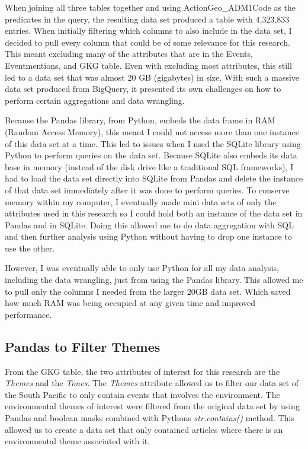 \documentclass[12pt]{article}
\begin{document}
When joining all three tables together and using ActionGeo\_ADM1Code as the predicates in the query, the resulting data set produced a table with 4,323,833 entries. When initially filtering which columns to also include in the data set, I decided to pull every column that could be of some relevance for this research. This meant excluding many of the attributes that are in the Events, Eventmentions, and GKG table. Even with excluding most attributes, this still led to a data set that was almost 20 GB (gigabytes) in size. With such a massive data set produced from BigQuery, it presented its own challenges on how to perform certain aggregations and data wrangling. 
    
Because the Pandas library, from Python, embeds the data frame in RAM (Random Access Memory), this meant I could not access more than one instance of this data set at a time. This led to issues when I used the SQLite library using Python to perform queries on the data set. Because SQLite also embeds its data base in memory (instead of the disk drive like a traditional SQL frameworks), I had to load the data set directly into SQLite from Pandas and delete the instance of that data set immediately after it was done to perform queries. To conserve memory within my computer, I eventually made mini data sets of only the attributes used in this research so I could hold both an instance of the data set in Pandas and in SQLite. Doing this allowed me to do data aggregation with SQL and then further analysis using Python without having to drop one instance to use the other. 

However, I was eventually able to only use Python for all my data analysis, including the data wrangling, just from using the Pandas library. This allowed me to pull only the columns I needed from the larger 20GB data set. Which saved how much RAM was being occupied at any given time and improved performance.  

\subsection*{Pandas to Filter Themes}

From the GKG table, the two attributes of interest for this research are the \textit{Themes} and the \textit{Tones}. The \textit{Themes} attribute allowed us to filter our data set of the South Pacific to only contain events that involves the environment. The environmental themes of interest were filtered from the original data set by using Pandas and boolean masks combined with Pythons \textit{str.contains()} method. This allowed us to create a data set that only contained articles where there is an environmental theme associated with it. 
\end{document}
